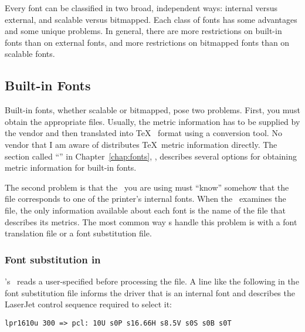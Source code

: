 Every font can be classified in two broad, independent ways: internal
versus external, and scalable versus bitmapped.  Each class of fonts
has some advantages and some unique problems.  In general, there
are more restrictions on built-in fonts than on external fonts, and
more restrictions on bitmapped fonts than on scalable fonts.

\subsection{Built-in Fonts}

Built-in fonts, whether 
scalable or bitmapped, pose two problems.
First, you must obtain the 
appropriate  files.  Usually, the
metric information has to be supplied by the vendor and then translated
into \TeX\  format using a conversion tool.  No vendor that I
am aware of distributes \TeX\ metric information 
directly.  
The section called ``'' in Chapter~\ref{chap:fonts},
{\it{}},
describes several
options for obtaining metric information for built-in fonts.

The second problem is that the \dvidriver\ you are using must ``know''
somehow that the  file corresponds to one of the printer's
internal fonts.  When the \dvidriver\ examines the  file, the
only information available about each font is the name of the
 file that describes its metrics.  
The most common way \dvidriver{}s handle this problem is with 
a font translation file or
a font substitution file.  

\subsubsection{Font substitution in \protect\emTeX}

\emTeX's \dvidriver\  reads 
a user-specified  before 
processing the  file.  A line like the following in
the font substitution file informs the  driver that
 is an internal font and describes the LaserJet
control sequence required to select it:

\begin{exindent}
  \verb|lpr1610u 300 => pcl: 10U s0P s16.66H s8.5V s0S s0B s0T|
\end{exindent}

